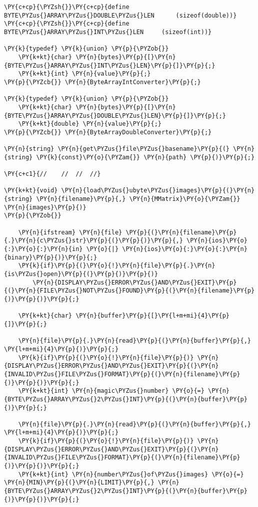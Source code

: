 \begin{Verbatim}[commandchars=\\\{\}]
\PY{c+cp}{\PYZsh{}}\PY{c+cp}{define		BYTE\PYZus{}ARRAY\PYZus{}DOUBLE\PYZus{}LEN		(sizeof(double))}
\PY{c+cp}{\PYZsh{}}\PY{c+cp}{define		BYTE\PYZus{}ARRAY\PYZus{}INT\PYZus{}LEN		(sizeof(int))}

\PY{k}{typedef} \PY{k}{union} \PY{p}{\PYZob{}}
    \PY{k+kt}{char} \PY{n}{bytes}\PY{p}{[}\PY{n}{BYTE\PYZus{}ARRAY\PYZus{}INT\PYZus{}LEN}\PY{p}{]}\PY{p}{;}
    \PY{k+kt}{int} \PY{n}{value}\PY{p}{;}
\PY{p}{\PYZcb{}} \PY{n}{ByteArrayIntConverter}\PY{p}{;}

\PY{k}{typedef} \PY{k}{union} \PY{p}{\PYZob{}}
    \PY{k+kt}{char} \PY{n}{bytes}\PY{p}{[}\PY{n}{BYTE\PYZus{}ARRAY\PYZus{}DOUBLE\PYZus{}LEN}\PY{p}{]}\PY{p}{;}
    \PY{k+kt}{double} \PY{n}{value}\PY{p}{;}
\PY{p}{\PYZcb{}} \PY{n}{ByteArrayDoubleConverter}\PY{p}{;}

\PY{n}{string} \PY{n}{get\PYZus{}file\PYZus{}basename}\PY{p}{(} \PY{n}{string} \PY{k}{const}\PY{o}{\PYZam{}} \PY{n}{path} \PY{p}{)}\PY{p}{;}

\PY{c+c1}{//	//	//	//}

\PY{k+kt}{void} \PY{n}{load\PYZus{}ubyte\PYZus{}images}\PY{p}{(}\PY{n}{string} \PY{n}{filename}\PY{p}{,} \PY{n}{MMatrix}\PY{o}{\PYZam{}} \PY{n}{images}\PY{p}{)}
\PY{p}{\PYZob{}}

	\PY{n}{ifstream} \PY{n}{file} \PY{p}{(}\PY{n}{filename}\PY{p}{.}\PY{n}{c\PYZus{}str}\PY{p}{(}\PY{p}{)}\PY{p}{,} \PY{n}{ios}\PY{o}{:}\PY{o}{:}\PY{n}{in} \PY{o}{|} \PY{n}{ios}\PY{o}{:}\PY{o}{:}\PY{n}{binary}\PY{p}{)}\PY{p}{;}
	\PY{k}{if}\PY{p}{(}\PY{o}{!}\PY{n}{file}\PY{p}{.}\PY{n}{is\PYZus{}open}\PY{p}{(}\PY{p}{)}\PY{p}{)}
		\PY{n}{DISPLAY\PYZus{}ERROR\PYZus{}AND\PYZus{}EXIT}\PY{p}{(}\PY{n}{FILE\PYZus{}NOT\PYZus{}FOUND}\PY{p}{(}\PY{n}{filename}\PY{p}{)}\PY{p}{)}\PY{p}{;}

	\PY{k+kt}{char} \PY{n}{buffer}\PY{p}{[}\PY{l+m+mi}{4}\PY{p}{]}\PY{p}{;}

	\PY{n}{file}\PY{p}{.}\PY{n}{read}\PY{p}{(}\PY{n}{buffer}\PY{p}{,} \PY{l+m+mi}{4}\PY{p}{)}\PY{p}{;}
	\PY{k}{if}\PY{p}{(}\PY{o}{!}\PY{n}{file}\PY{p}{)} \PY{n}{DISPLAY\PYZus{}ERROR\PYZus{}AND\PYZus{}EXIT}\PY{p}{(}\PY{n}{INVALID\PYZus{}FILE\PYZus{}FORMAT}\PY{p}{(}\PY{n}{filename}\PY{p}{)}\PY{p}{)}\PY{p}{;}
	\PY{k+kt}{int} \PY{n}{magic\PYZus{}number} \PY{o}{=} \PY{n}{BYTE\PYZus{}ARRAY\PYZus{}2\PYZus{}INT}\PY{p}{(}\PY{n}{buffer}\PY{p}{)}\PY{p}{;}
	
	\PY{n}{file}\PY{p}{.}\PY{n}{read}\PY{p}{(}\PY{n}{buffer}\PY{p}{,} \PY{l+m+mi}{4}\PY{p}{)}\PY{p}{;}
	\PY{k}{if}\PY{p}{(}\PY{o}{!}\PY{n}{file}\PY{p}{)} \PY{n}{DISPLAY\PYZus{}ERROR\PYZus{}AND\PYZus{}EXIT}\PY{p}{(}\PY{n}{INVALID\PYZus{}FILE\PYZus{}FORMAT}\PY{p}{(}\PY{n}{filename}\PY{p}{)}\PY{p}{)}\PY{p}{;}
	\PY{k+kt}{int} \PY{n}{number\PYZus{}of\PYZus{}images} \PY{o}{=} \PY{n}{MIN}\PY{p}{(}\PY{n}{LIMIT}\PY{p}{,} \PY{n}{BYTE\PYZus{}ARRAY\PYZus{}2\PYZus{}INT}\PY{p}{(}\PY{n}{buffer}\PY{p}{)}\PY{p}{)}\PY{p}{;}
	

\end{Verbatim}
